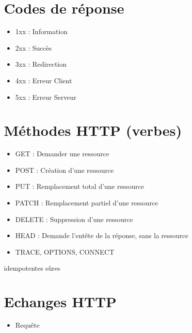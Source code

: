 \hypertarget{codes-de-ruxe9ponse}{%
\section{Codes de réponse}\label{codes-de-ruxe9ponse}}

\begin{itemize}
\tightlist
\item
  1xx : Information
\item
  2xx : Succès
\item
  3xx : Redirection
\item
  4xx : Erreur Client
\item
  5xx : Erreur Serveur
\end{itemize}

\hypertarget{muxe9thodes-http-verbes}{%
\section{Méthodes HTTP (verbes)}\label{muxe9thodes-http-verbes}}

\begin{itemize}
\tightlist
\item
  {GET} : Demander une ressource
\item
  POST : Création d'une ressource
\item
  {PUT} : Remplacement total d'une ressource
\item
  PATCH : Remplacement partiel d'une ressource
\item
  {DELETE} : Suppression d'une ressource
\item
  {HEAD} : Demande l'entête de la réponse, sans la ressource
\item
  {TRACE, OPTIONS}, CONNECT
\end{itemize}

{idempotentes} {sûres}

\hypertarget{echanges-http}{%
\section{Echanges HTTP}\label{echanges-http}}

\begin{itemize}
\tightlist
\item
  Requête
\end{itemize}

\begin{english}

\begin{Shaded}
\begin{Highlighting}[]
\NormalTok{[CRLF]}
\end{Highlighting}
\end{Shaded}

\end{english}

